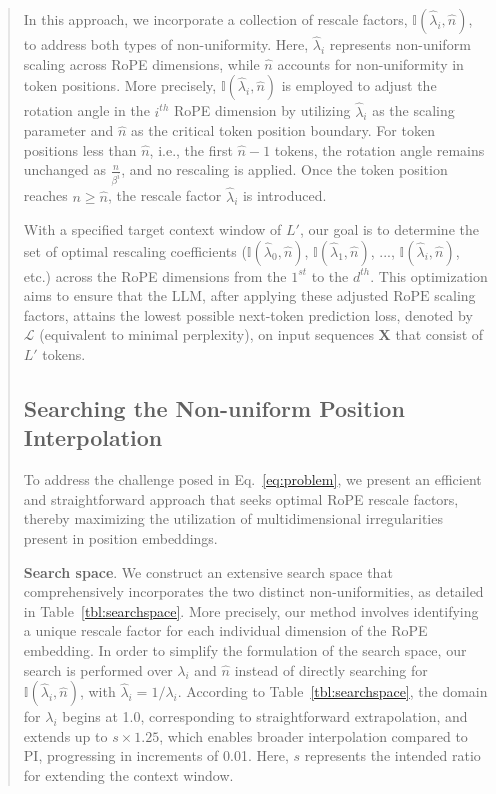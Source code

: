 \begin{abstract}
In this approach, we incorporate a collection of rescale factors, $\mathbb{I}(\hat{\lambda}_{i},\hat{n})$, to address both types of non-uniformity. Here, $\hat{\lambda}_i$ represents non-uniform scaling across RoPE dimensions, while $\hat{n}$ accounts for non-uniformity in token positions. More precisely, $\mathbb{I}(\hat{\lambda}_{i},\hat{n})$ is employed to adjust the rotation angle in the $i^{th}$ RoPE dimension by utilizing $\hat\lambda_{i}$ as the scaling parameter and $\hat{n}$ as the critical token position boundary. For token positions less than $\hat{n}$, i.e., the first $\hat{n}-1$ tokens, the rotation angle remains unchanged as $\frac{n}{\beta^i}$, and no rescaling is applied. Once the token position reaches $n \ge \hat{n}$, the rescale factor $\hat{\lambda}_i$ is introduced.

With a specified target context window of $L'$, our goal is to determine the set of optimal rescaling coefficients ($\mathbb{I}(\hat{\lambda}_{0},\hat{n})$, $\mathbb{I}(\hat{\lambda}_{1},\hat{n})$, ..., $\mathbb{I}(\hat{\lambda}_{i},\hat{n})$, etc.) across the RoPE dimensions from the $1^{st}$ to the $d^{th}$. This optimization aims to ensure that the $\text{LLM}$, after applying these adjusted $\text{RoPE}$ scaling factors, attains the lowest possible next-token prediction loss, denoted by $\mathcal{L}$ (equivalent to minimal perplexity), on input sequences $\mathbf{X}$ that consist of $L'$ tokens.

\subsection{Searching the Non-uniform Position Interpolation}

To address the challenge posed in Eq.~\ref{eq:problem}, we present an efficient and straightforward approach that seeks optimal RoPE rescale factors, thereby maximizing the utilization of multidimensional irregularities present in position embeddings.

\textbf{Search space}. We construct an extensive search space that comprehensively incorporates the two distinct non-uniformities, as detailed in Table~\ref{tbl:searchspace}. More precisely, our method involves identifying a unique rescale factor for each individual dimension of the RoPE embedding. In order to simplify the formulation of the search space, our search is performed over $\lambda_i$ and $\hat{n}$ instead of directly searching for $\mathbb{I}(\hat{\lambda}_{i},\hat{n})$, with  $\hat{\lambda}_{i}=1/\lambda_i$. 
According to Table~\ref{tbl:searchspace}, the domain for $\lambda_i$ begins at 1.0, corresponding to straightforward extrapolation, and extends up to $s\times1.25$, which enables broader interpolation compared to PI, progressing in increments of 0.01. Here, $s$ represents the intended ratio for extending the context window.


\end{abstract}
